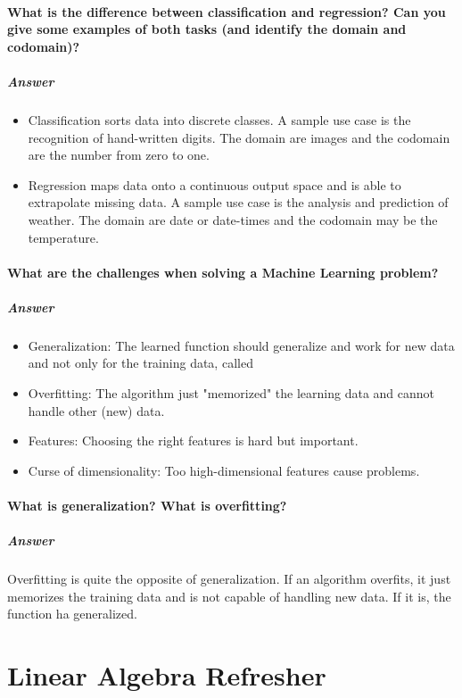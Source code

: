 \documentclass[a4paper, 11pt, accentcolor = tud3b]{tudreport}
\newcommand{\answer}[1]{\subparagraph{Answer} #1}
\begin{document}
			\paragraph{What is the difference between classification and regression? Can you give some examples of both tasks (and identify the domain and codomain)?}
			\answer{
				\begin{itemize}
					\item Classification sorts data into discrete classes. A sample use case is the recognition of hand-written digits. The domain are images and the codomain are the number from zero to one.
					\item Regression maps data onto a continuous output space and is able to extrapolate missing data. A sample use case is the analysis and prediction of weather. The domain are date or date-times and the codomain may be the temperature.
				\end{itemize}
			}

			\paragraph{What are the challenges when solving a Machine Learning problem?}
			\answer{
				\begin{itemize}
					\item Generalization: The learned function should generalize and work for new data and not only for the training data, called
					\item Overfitting: The algorithm just "memorized" the learning data and cannot handle other (new) data.
					\item Features: Choosing the right features is hard but important.
					\item Curse of dimensionality: Too high-dimensional features cause problems.
				\end{itemize}
			}

			\paragraph{What is generalization? What is overfitting?}
			\answer{Overfitting is quite the opposite of generalization. If an algorithm overfits, it just memorizes the training data and is not capable of handling new data. If it is, the function ha generalized.}

		\section{Linear Algebra Refresher}
\end{document}
